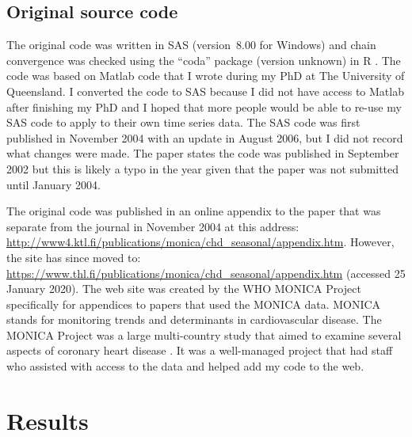 \subsection{Original source code}

The original code was written in SAS (version~8.00 for Windows) and chain convergence was checked using the ``coda'' package (version unknown) in R \supercite{coda}. The code was based on Matlab code that I wrote during my PhD \supercite{Barnett2003} at The University of Queensland. I converted the code to SAS because I did not have access to Matlab after finishing my PhD and I hoped that more people would be able to re-use my SAS code to apply to their own time series data. 
The SAS code was first published in November 2004 with an update in August 2006, but I did not record what changes were made. 
The paper states the code was published in September 2002 but this is likely a typo in the year given that the paper was not submitted until January 2004. 

The original code was published in an online appendix to the paper that was separate from the journal in November 2004 at this address: \url{http://www4.ktl.fi/publications/monica/chd_seasonal/appendix.htm}. However, the site has since moved to: \url{https://www.thl.fi/publications/monica/chd_seasonal/appendix.htm} (accessed 25 January 2020). The web site was created by the WHO MONICA Project specifically for appendices to papers that used the MONICA data. MONICA stands for monitoring trends and determinants in cardiovascular disease. The MONICA Project was a large multi-country study that aimed to examine several aspects of coronary heart disease \supercite{Tunstall2003}. It was a well-managed project that had staff who assisted with access to the data and helped add my code to the web.  


\section{Results}


